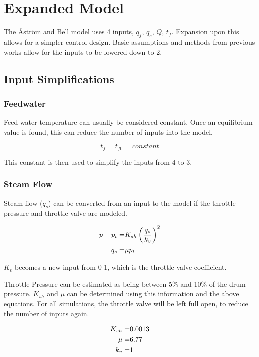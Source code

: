 \section{Expanded Model}
    
    The \r{A}str\"{o}m and Bell model uses 4 inputs, $q_f$, $q_s$, $Q$, $t_f$. Expansion upon this allows for a simpler control design. Basic assumptions and methods from previous works allow for the inputs to be lowered down to 2. 
    
    \subsection{Input Simplifications}
    
        \subsubsection{Feedwater}
            Feed-water temperature can usually be considered constant. Once an equilibrium value is found, this can reduce the number of inputs into the model. 
            
            $$ t_{f} = t_{f0} = constant$$
            
            This constant is then used to simplify the inputs from 4 to 3. 
            
        \subsubsection{Steam Flow}
            Steam flow ($q_s$) can be converted from an input to the model if the throttle pressure and throttle valve are modeled. \cite{Iacob}
            
            $$ \aligned
                p - p_t =&K_{sh} \left ( \frac{ q_s}{k_v} \right )^{2} \\
                q_s =& \mu p_t 
            \endaligned$$
            
            $K_v$ becomes a new input from 0-1, which is the throttle valve coefficient. 
            
            Throttle Pressure can be estimated as being between 5\% and 10\% of the drum pressure.\cite{IacobEmail} $K_{sh}$ and $\mu$ can be determined using this information and the above equations. For all simulations, the throttle valve will be left full open, to reduce the number of inputs again. 
            
            $$ \aligned
                K_{sh} =& 0.0013  \\
                \mu    =& 6.77 \\ 
                k_v    =& 1
            \endaligned$$
                


